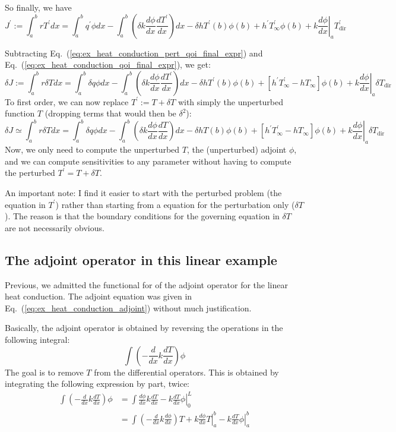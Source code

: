 \documentclass[11pt]{article}
\newcommand{\eqt}[1]{Eq.~(\ref{#1})}                     %
\newcommand{\be}{\begin{equation}}
\newcommand{\ee}{\end{equation}}
\begin{document}
So finally, we have
\be
\label{eq:ex_heat_conduction_pert_qoi_final_expr}
\boxed{
J^\prime := \int_a^b r T^\prime dx 
= 
\int_a^b q^\prime \phi dx 
- \int_a^b \left( \delta k\frac{d\phi}{dx}\frac{dT^\prime}{dx} \right) dx 
- \delta h T^\prime(b) \phi(b) + h^\prime T^\prime_{\infty} \phi(b) 
+ \left.k\frac{d\phi}{dx}\right|_a T^\prime_{\text{dir}} 
}
\ee


Subtracting \eqt{eq:ex_heat_conduction_pert_qoi_final_expr} and \eqt{eq:ex_heat_conduction_qoi_final_expr}, we get:
\be
\label{eq:ex_heat_conduction_delta_qoi_expr}
\boxed{
\delta J := \int_a^b r \delta T dx 
= 
\int_a^b \delta q \phi dx 
- \int_a^b \left( \delta k\frac{d\phi}{dx}\frac{dT^\prime}{dx} \right) dx 
- \delta h T^\prime(b) \phi(b) + \left[ h^\prime T^\prime_{\infty} - h T_{\infty} \right] \phi(b) 
+ \left.k\frac{d\phi}{dx}\right|_a \delta T_{\text{dir}} 
}
\ee
To first order, we can now replace $T^\prime:= T + \delta T$ with simply the unperturbed function $T$ (dropping terms that would then be $\delta ^2$):
\be
\label{eq:ex_heat_conduction_delta_qoi_expr_final}
\boxed{
\delta J \simeq \int_a^b r \delta T dx 
= 
\int_a^b \delta q \phi dx 
- \int_a^b \left( \delta k\frac{d\phi}{dx}\frac{dT}{dx} \right) dx 
- \delta h T(b) \phi(b) + \left[ h^\prime T^\prime_{\infty} - h T_{\infty} \right] \phi(b) 
+ \left.k\frac{d\phi}{dx}\right|_a \delta T_{\text{dir}} 
}
\ee
Now, we only need to compute the unperturbed $T$, the (unperturbed) adjoint $\phi$, and we can compute sensitivities to any parameter without having to compute the perturbed $T^\prime=T+\delta T$.

An important note: I find it easier to start with the perturbed problem (the equation in $T^\prime$) rather than starting from a equation for the perturbation only ($\delta T$). The reason is that the boundary conditions for the governing equation in $\delta T$ are not necessarily obvious.


\subsection{The adjoint operator in this linear example}
Previous, we admitted the functional for of the adjoint operator for the linear heat conduction. The adjoint equation was given in \eqt{eq:ex_heat_conduction_adjoint} without much justification.

Basically, the adjoint operator is obtained by reversing the operations in the following integral:
\[
\int \left( -\frac{d}{dx}k\frac{dT}{dx} \right) \phi 
\]
The goal is to remove $T$ from the differential operators. This is obtained by integrating the following expression by part, twice:
\begin{align}
\int \left( -\frac{d}{dx}k\frac{dT}{dx} \right) \phi 
&= \int \frac{d\phi}{dx}k\frac{dT}{dx}  - \left. k\frac{dT}{dx}\phi\right|_0^L \nonumber\\
&=
\int \left(-\frac{d}{dx}k\frac{d\phi}{dx} \right)T  + \left. k\frac{d\phi}{dx}T\right|_a^b  - \left. k\frac{dT}{dx}\phi\right|_a^b 
\end{align}
\end{document}
